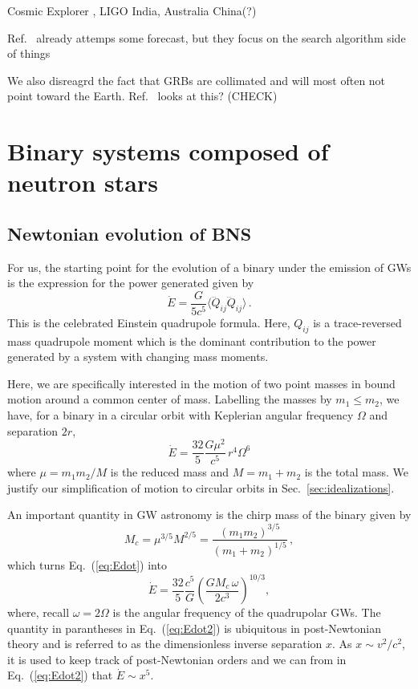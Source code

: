 \documentclass[11pt,a4paper]{article}
\newcommand{\f}{\frac}
\newcommand{\be}{\begin{equation}}
\newcommand{\ee}{\end{equation}}
\begin{document}
Cosmic Explorer \cite{CE}, LIGO India, Australia China(?)


Ref.~\cite{Cannon:2011vi} already attemps some forecast, but they focus on the search algorithm side of things

We also disreagrd the fact that GRBs are collimated and will most often not point toward the Earth. Ref.~\cite{Patricelli:2016bkt} looks at this? (CHECK)

\section{Binary systems composed of neutron stars}\label{sec:BNS_inspiral}
\subsection{Newtonian evolution of BNS}
For us, the starting point for the evolution of a binary under the emission of GWs is the expression for the power generated given by 
%
\be
\dot{E} = \f{G}{5c^5}\langle \dddot{Q}_{ij}\dddot{Q}_{ij} \rangle \label{eq:Edot_quadrupole}\, .
\ee
%
This is the celebrated Einstein quadrupole formula. 
Here, $Q_{ij}$ is a trace-reversed mass quadrupole moment which
is the dominant contribution to the power generated %
by a system with changing mass moments. 

Here, we are specifically interested in the motion of two point masses in bound motion around a common center of mass.
Labelling the masses by $m_1 \le m_2$, we have, for a binary in a circular orbit with Keplerian angular frequency $\Omega$ and separation $2r$,
%
\be
\dot{E} = \f{32}{5}\f{G\mu^2}{c^5}\, r^4 \Omega^6\label{eq:Edot}
\ee
%
where $\mu= m_1 m_2/M$ is the reduced mass and $M=m_1+m_2$ is the total mass. 
We justify our simplification of motion to circular orbits in Sec.~\ref{sec:idealizations}.

An important quantity in GW astronomy is the chirp mass of the binary given by
%
\be
M_c = \mu^{3/5} M^{2/5} = \f{(m_1 m_2)^{3/5}}{(m_1+m_2)^{1/5}} \label{eq:chirp_mass}\, ,
\ee
%
which turns Eq.~(\ref{eq:Edot}) into
%
\be
\dot{E} = \f{32}{5}\f{c^5}{G} \left(\f{G M_c\, \omega}{2c^3}\right)^{10/3}, \label{eq:Edot2}
\ee
%
where, recall $\omega=2\Omega$ is the angular frequency of the quadrupolar GWs. 
The quantity in parantheses in Eq.~(\ref{eq:Edot2}) is ubiquitous in post-Newtonian theory and is
referred to as the dimensionless inverse separation $x$.
As $x\sim v^2/c^2$, it is used to keep track of post-Newtonian orders and we can from in Eq.~(\ref{eq:Edot2}) that $\dot{E}\sim x^5$. 
\end{document}
